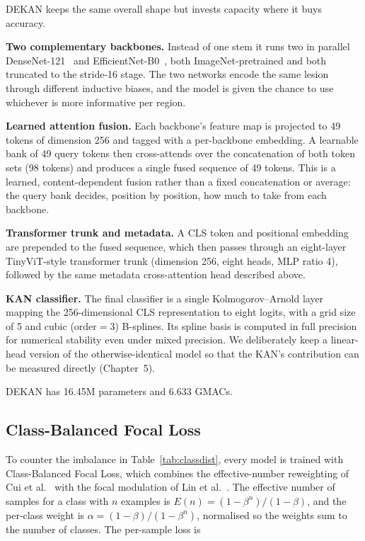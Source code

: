 DEKAN keeps the same overall shape but invests capacity where it buys accuracy.

\textbf{Two complementary backbones.} Instead of one stem it runs two in
parallel DenseNet-121~\cite{huang2017densenet} and
EfficientNet-B0~\cite{tan2019efficientnet}, both ImageNet-pretrained and both
truncated to the stride-16 stage. The two networks encode the same lesion through
different inductive biases, and the model is given the chance to use whichever is
more informative per region.

\textbf{Learned attention fusion.} Each backbone's feature map is projected to
49 tokens of dimension 256 and tagged with a per-backbone embedding. A learnable
bank of 49 query tokens then cross-attends over the concatenation of both token
sets (98 tokens) and produces a single fused sequence of 49 tokens. This is a
learned, content-dependent fusion rather than a fixed concatenation or average:
the query bank decides, position by position, how much to take from each
backbone.

\textbf{Transformer trunk and metadata.} A CLS token and positional embedding are
prepended to the fused sequence, which then passes through an eight-layer
TinyViT-style transformer trunk (dimension 256, eight heads, MLP ratio 4),
followed by the same metadata cross-attention head described above.

\textbf{KAN classifier.} The final classifier is a single Kolmogorov--Arnold
layer~\cite{liu2024kan} mapping the 256-dimensional CLS representation to eight
logits, with a grid size of 5 and cubic ($\text{order}=3$) B-splines. Its spline
basis is computed in full precision for numerical stability even under mixed
precision. We deliberately keep a linear-head version of the otherwise-identical
model so that the KAN's contribution can be measured directly (Chapter~5).

DEKAN has 16.45M parameters and 6.633 GMACs.

\subsection{Class-Balanced Focal Loss}

To counter the imbalance in Table~\ref{tab:classdist}, every model is trained
with Class-Balanced Focal Loss, which combines the effective-number reweighting
of Cui et al.~\cite{cui2019classbalanced} with the focal modulation of Lin et
al.~\cite{lin2017focal}. The effective number of samples for a class with $n$
examples is $E(n) = (1-\beta^{n})/(1-\beta)$, and the per-class weight is
$\alpha = (1-\beta)/(1-\beta^{n})$, normalised so the weights sum to the number
of classes. The per-sample loss is

